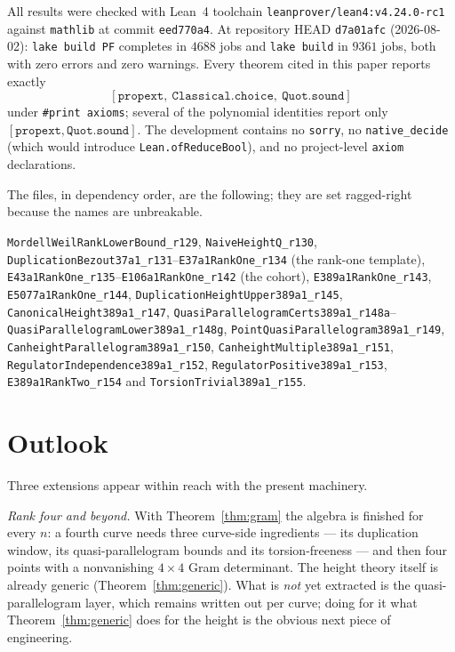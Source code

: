 \documentclass[11pt,reqno]{amsart}
\theoremstyle{plain}
\theoremstyle{definition}
\theoremstyle{remark}
\DeclareRobustCommand{\lt}[1]{\texttt{#1}}
\begin{document}
All results were checked with Lean~4 toolchain
\texttt{leanprover/lean4:v4.24.0-rc1} against \texttt{mathlib} at commit
\texttt{eed770a4}. At repository HEAD \texttt{d7a01afc} (2026-08-02):
\lt{lake build PF} completes in $4688$ jobs and \lt{lake build} in $9361$
jobs, both with zero errors and zero warnings. Every theorem cited in this
paper reports exactly
\[
  [\mathtt{propext},\ \mathtt{Classical.choice},\ \mathtt{Quot.sound}]
\]
under \lt{\#print axioms}; several of the polynomial identities report only
$[\mathtt{propext}, \mathtt{Quot.sound}]$. The development contains no
\lt{sorry}, no \lt{native\_decide} (which would introduce
\lt{Lean.ofReduceBool}), and no project-level \lt{axiom} declarations.

The files, in dependency order, are the following; they are set
ragged-right because the names are unbreakable.

\begin{flushleft}
\lt{MordellWeilRankLowerBound\_r129}, \lt{NaiveHeightQ\_r130},
\lt{DuplicationBezout37a1\_r131}--\lt{E37a1RankOne\_r134} (the rank-one
template), \lt{E43a1RankOne\_r135}--\lt{E106a1RankOne\_r142} (the cohort),
\lt{E389a1RankOne\_r143}, \lt{E5077a1RankOne\_r144},
\lt{DuplicationHeightUpper389a1\_r145}, \lt{CanonicalHeight389a1\_r147},
\lt{QuasiParallelogramCerts389a1\_r148a}--\lt{QuasiParallelogramLower389a1\_r148g},
\lt{PointQuasiParallelogram389a1\_r149},
\lt{CanheightParallelogram389a1\_r150}, \lt{CanheightMultiple389a1\_r151},
\lt{RegulatorIndependence389a1\_r152}, \lt{RegulatorPositive389a1\_r153},
\lt{E389a1RankTwo\_r154} and \lt{TorsionTrivial389a1\_r155}.
\end{flushleft}

\section{Outlook}

Three extensions appear within reach with the present machinery.

\emph{Rank four and beyond.} With Theorem~\ref{thm:gram} the algebra is
finished for every $n$: a fourth curve needs three curve-side ingredients ---
its duplication window, its quasi-parallelogram bounds and its torsion-freeness
--- and then four points with a nonvanishing $4\times4$ Gram determinant. The
height theory itself is already generic (Theorem~\ref{thm:generic}). What is
\emph{not} yet extracted is the quasi-parallelogram layer, which remains
written out per curve; doing for it what Theorem~\ref{thm:generic} does for the
height is the obvious next piece of engineering.
\end{document}

